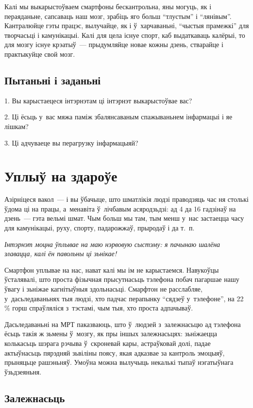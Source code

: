 Калі мы выкарыстоўваем смартфоны бескантрольна, яны могуць, як і пераяданьне, сапсаваць наш мозг, зрабіць яго больш ``тлустым'' і ``лянівым''. Кантралюйце гэты працэс, вылучайце, як і ў~харчаваньні, ``чыстыя прамежкі'' для творчасьці і камунікацыі. Калі для цела існуе спорт, каб выдаткаваць калёрыі, то для мозгу існуе крэатыў~--- прыдумляйце новае кожны дзень, стварайце і практыкуйце свой мозг.

\subsection*{Пытаньні і заданьні}

1. Вы карыстаецеся інтэрнэтам ці інтэрнэт выкарыстоўвае вас?

2. Ці ёсьць у~вас мяжа паміж збалянсаваным спажываньнем інфармацыі і яе лішкам?

3. Ці адчуваеце вы перагрузку інфармацыяй?


\section{Уплыў на здароўе}

Азірніцеся вакол~--- і вы ўбачыце, што шматлікія людзі праводзяць час ня столькі ўдома ці на працы, а~менавіта ў~лічбавым асяродзьдзі: ад 4 да 16 гадзінаў на дзень~--- гэта вельмі шмат. Чым больш мы там, тым менш у~нас застаецца часу для камунікацыі, руху, спорту, падарожжаў, прыродаў і да т.~п.

\emph{Інтэрнэт моцна ўплывае на маю нэрвовую сыстэму: я пачынаю шалёна злавацца, калі ён павольны ці зьнікае!}

Смартфон уплывае на нас, нават калі мы ім не карыстаемся. Навукоўцы ўсталявалі, што проста фізычная прысутнасьць тэлефона побач пагаршае нашу ўвагу і зьніжае кагнітыўныя здольнасьці. Смарфтон не расслабляе, у~дасьледаваньнях тыя людзі, хто падчас перапынку ``сядзеў у~тэлефоне'', на 22\,\% горш спраўляліся з~тэстамі, чым тыя, хто проста адпачываў.

Дасьледаваньні на МРТ паказваюць, што ў~людзей з~залежнасьцю ад тэлефона ёсьць такія ж зьмены ў~мозгу, як пры іншых залежнасьцях: зьніжаецца колькасьць шэрага рэчыва ў~скроневай кары, астраўковай долі, падае актыўнасьць пярэдняй зьвіліны поясу, якая адказвае за кантроль эмоцыяў, прыняцьце рашэньняў. Умоўна можна вылучыць некалькі тыпаў нэгатыўнага ўзьдзеяньня.

\subsection*{Залежнасьць}

